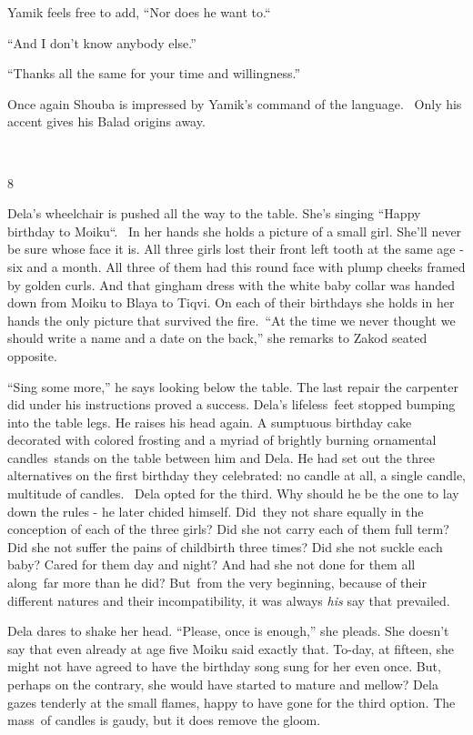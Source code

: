 \documentclass[twoside,11pt]{book}
\begin{document}
Yamik feels free to add, ``Nor does he want to.``\ 

``And I don't know anybody else.'' 

``Thanks all the same for your time and willingness.''

Once again Shouba is impressed by Yamik's command of the language. \ Only his accent gives his Balad origins away.

~

8 

Dela's wheelchair is pushed all the way to the table. She's singing ``Happy birthday to
Moiku``. ~In her hands she holds a picture of a small girl. She'll never be sure whose face it is. All
three girls lost their front left tooth at the same age - six and a month. All three of them had this round face with
plump cheeks framed by golden curls. And that gingham dress with the white baby collar was handed down from Moiku to
Blaya to Tiqvi. On each of their birthdays she holds in her hands the only picture that survived the
fire.\ ``At the time we never thought we should write a name and a date on the back,'' she
remarks to Zakod seated opposite.

``Sing some more,'' he says looking below the table. The last repair the carpenter did under
his instructions proved a success. Dela's lifeless\ feet stopped bumping into the table legs. He raises his head again.
A sumptuous birthday cake decorated with colored frosting and a myriad of brightly burning ornamental candles~stands on
the table between him and Dela. He had set out the three alternatives on the first birthday they celebrated: no candle
at all, a single candle, multitude of candles.~ Dela opted for the third. Why should he be the one to lay down the
rules - he later chided himself. Did~they not share equally in the conception of each of the three girls? Did she not
carry each of them full term? Did she not suffer the pains of childbirth three times? Did she not suckle each baby?
Cared for them day and night? And had she not done for them all along\ far more than he did? But\ from the very
beginning, because of their different natures and their incompatibility, it was always \textit{his} say that
prevailed.\ 

Dela dares to shake her head. ``Please, once is enough,'' she pleads. She doesn't say that
even already at age five Moiku said exactly that. To-day, at fifteen, she might not have agreed to have the birthday
song sung for her even once. But, perhaps on the contrary, she would have started to mature and mellow? Dela gazes
tenderly at the small flames, happy to have gone for the third option. The mass\ of candles is gaudy, but it does
remove the gloom.\ 
\end{document}
